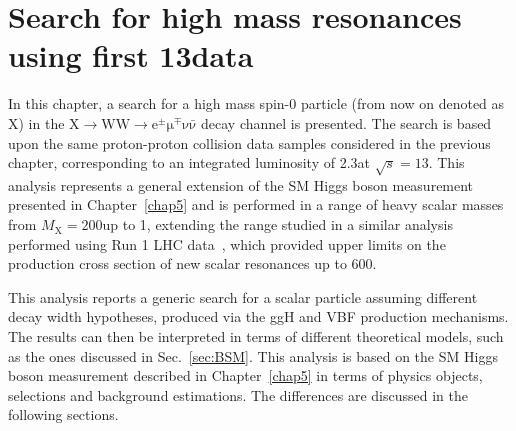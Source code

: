 \chapter[Search for high mass resonances using first \boldmath$13\TeV$ data]{Search for high mass resonances using first 13\TeV data}\label{chap6}
\thispagestyle{empty}

In this chapter, a search for a high mass spin-0 particle (from now on denoted as X) in the $\mathrm{X\to WW \to e^{\pm}\mu^{\mp}\nu\bar{\nu}}$ decay channel is presented. 
The search is based upon the same proton-proton collision data samples considered in the previous chapter, corresponding to an integrated luminosity of 2.3\ifb  at $\sqrt{s} = 13$\TeV. This analysis represents a general extension of the SM Higgs boson measurement presented in Chapter~\ref{chap5} and is performed in a range of heavy scalar masses from $M_\mathrm{X} = 200$\GeV up to 1\TeV, extending the range studied in a similar analysis performed using Run 1 LHC data~\cite{Khachatryan:2015cwa}, which provided upper limits on the production cross section of new scalar resonances up to 600\GeV.


This analysis reports a generic search for a scalar particle assuming different decay width hypotheses, produced via the ggH and VBF production mechanisms. The results can then be interpreted in terms of different theoretical models, such as the ones discussed in Sec.~\ref{sec:BSM}. This analysis is based on the SM Higgs boson measurement described in Chapter~\ref{chap5} in terms of physics objects, selections and background estimations. The differences are discussed in the following sections.

%






